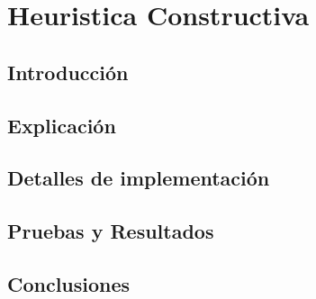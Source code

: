 \section {Heuristica Constructiva}
\subsection{Introducción}


\subsection{Explicación}


\subsection{Detalles de implementación}


\subsection{Pruebas y Resultados}


\subsection{Conclusiones}

